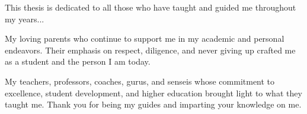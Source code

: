\documentclass[12pt,american]{report}
\begin{document}
\copyrightfalse%
{}

\beforepreface%

\vfill
\begin{center}
This thesis is dedicated to all those who have taught and guided me throughout my years... 


My loving parents who continue to support me in my academic and personal endeavors.  Their emphasis on respect, diligence, and never giving up crafted me as a student and the person I am today.  


My teachers, professors, coaches, gurus, and senseis whose commitment to excellence, student development, and higher education brought light to what they taught me.  Thank you for being my guides and imparting your knowledge on me.
\end{center}
\vfill
\end{document}
